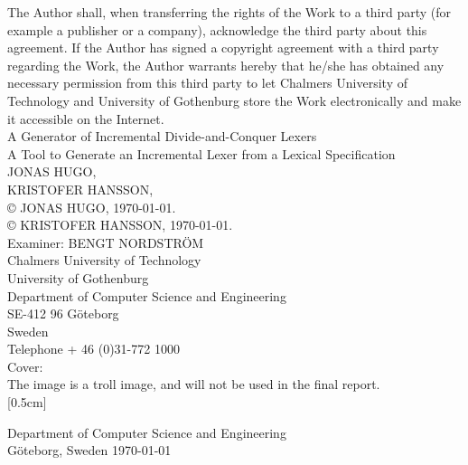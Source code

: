 \begin{titlepage}
\begin{flushleft}
{{The Author shall, when transferring the rights of the Work to a third party
(for example a publisher or a company), acknowledge the third party about
this agreement. If the Author has signed a copyright agreement with a third
party regarding the Work, the Author warrants hereby that he/she has obtained
any necessary permission from this third party to let Chalmers University of
Technology and University of Gothenburg store the Work electronically and
make it accessible on the Internet.\\[2cm]

A Generator of Incremental Divide-and-Conquer Lexers \\
A Tool to Generate an Incremental Lexer from a Lexical Specification\\

JONAS HUGO, \\
KRISTOFER HANSSON, \\[0.8cm]

© JONAS HUGO, \mydate\today.\\
© KRISTOFER HANSSON, \mydate\today.\\[0.5cm]

Examiner: BENGT NORDSTRÖM\\[0.5cm]

Chalmers University of Technology\\
University of Gothenburg\\
Department of Computer Science and Engineering\\
SE-412 96 Göteborg\\
Sweden\\
Telephone + 46 (0)31-772 1000\\[0.8cm]

Cover:\\
The image is a troll image, and will not be used in the final report.\\
[0.5cm]

Department of Computer Science and Engineering\\
Göteborg, Sweden \mydate\today

    }
    }

\end{flushleft}

\end{titlepage}

\thispagestyle{empty}
\newpage
\clearpage
\mbox{}
\newpage
\clearpage
\thispagestyle{empty}

